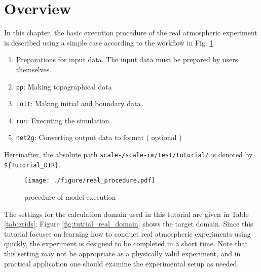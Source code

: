 \section{Overview} \label{sec:tutrial_real_intro}
In this chapter, the basic execution procedure of the real atmospheric experiment is described using a simple case according to the workflow in Fig. \ref{fig:howto}.
\begin{enumerate}
\item Preparations for input data. The input data must be prepared by users themselves.
\item \texttt{pp}:   Making topographical data
\item \texttt{init}: Making initial and boundary data
\item \texttt{run}:  Executing the simulation
\item \texttt{net2g}: Converting {\netcdf} output data to {\grads} format ( optional )
\end{enumerate}
Hereinafter, the absolute path \texttt{scale-{\version}/scale-rm/test/tutorial/} is denoted by\\
\verb|${Tutorial_DIR}|.

\begin{figure}[tb]
\begin{center}
  \texttt{[image: ./figure/real\_procedure.pdf]}\\
  \caption{\scalerm procedure of model execution}
  \label{fig:howto}
\end{center}
\end{figure}

The settings for the calculation domain used in this tutorial are given in Table \ref{tab:grids}.
Figure \ref{fig:tutrial_real_domain} shows the target domain.
Since this tutorial focuses on learning how to conduct 
real atmospheric experiments using \scalerm quickly,
the experiment is designed to be completed in a short time.
Note that this setting may not be appropriate as a physically valid experiment, 
and in practical application one should examine the experimental setup as needed.

